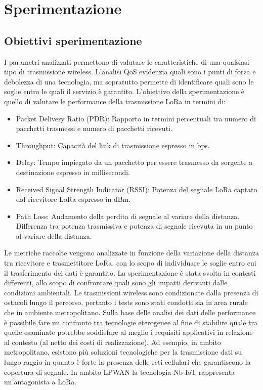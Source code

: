 \documentclass[12pt,a4paper,openright,twoside]{report}
\begin{document}
\chapter{Sperimentazione} 
\section{Obiettivi sperimentazione}
I parametri analizzati permettono di valutare le caratteristiche di una qualsiasi tipo di trasmissione wireless. L'analisi QoS evidenzia quali sono i punti di forza e debolezza di una tecnologia, ma sopratutto permette di identificare quali sono le soglie entro le quali il servizio \`e garantito. 
L'obiettivo della sperimentazione \`e quello di valutare le performance della trasmissione LoRa in termini di:
\begin{itemize}                       
\item Packet Delivery Ratio (PDR): Rapporto in termini percentuali tra numero di pacchetti trasmessi e numero di pacchetti ricevuti.
\item Throughput: Capacit\`a del link di trasmissione espresso in bps.
\item Delay: Tempo impiegato da un pacchetto per essere trasmesso da sorgente a destinazione espresso in millisecondi.
\item Received Signal Strength Indicator (RSSI): Potenza del segnale LoRa captato dal ricevitore LoRa espresso in dBm.
\item Path Loss: Andamento della perdita di segnale al variare della distanza. Differenza tra potenza trasmissiva e potenza di segnale ricevuta in un punto al variare della distanza.
\end{itemize}
Le metriche raccolte vengono analizzate in funzione della variazione della distanza tra ricevitore e trasmettitore LoRa, con lo scopo di individuare le soglie entro cui il trasferimento dei dati \`e garantito. 
La sperimentazione \`e stata svolta in contesti differenti, allo scopo di confrontare quali sono gli impatti derivanti dalle condizioni ambientali.
Le trasmissioni wireless sono condizionate dalla presenza di ostacoli lungo il percorso, pertanto i tests sono stati condotti sia in area rurale che in ambiente metropolitano.    
Sulla base delle analisi dei dati delle performance \`e possibile fare un confronto tra tecnologie eterogenee al fine di stabilire quale tra quelle esaminate potrebbe soddisfare al meglio i requisiti applicativi in relazione al contesto (al netto dei costi di realizzazione). 
Ad esempio, in ambito metropolitano, esistono pi\`u soluzioni tecnologiche per la trasmissione dati su lungo raggio in quanto \`e forte la presenza delle reti cellulari che garantiscono la copertura di segnale. In ambito LPWAN la tecnologia Nb-IoT rappresenta un'antagonista a LoRa. 
\end{document}
